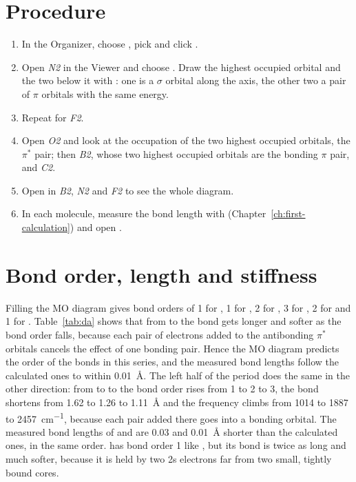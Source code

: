 \section{Procedure}
\begin{enumerate}
	\item In the Organizer, choose , pick  and click .
	\item Open \emph{N2} in the Viewer and choose . Draw the highest occupied orbital and the two below it with : one is a $\sigma$ orbital along the axis, the other two a pair of $\pi$ orbitals with the same energy.
	\item Repeat for \emph{F2}.
	\item Open \emph{O2} and look at the occupation of the two highest occupied orbitals, the $\pi^*$ pair; then \emph{B2}, whose two highest occupied orbitals are the bonding $\pi$ pair, and \emph{C2}.
	\item Open  in \emph{B2}, \emph{N2} and \emph{F2} to see the whole diagram.
	\item In each molecule, measure the bond length with  (Chapter~\ref{ch:first-calculation}) and open .
\end{enumerate}

\section{Bond order, length and stiffness}
Filling the MO diagram gives bond orders of 1 for , 1 for , 2 for , 3 for , 2 for  and 1 for . Table~\ref{tab:da} shows that from  to  the bond gets longer and softer as the bond order falls, because each pair of electrons added to the antibonding $\pi^*$ orbitals cancels the effect of one bonding pair. Hence the MO diagram predicts the order of the bonds in this series, and the measured bond lengths follow the calculated ones to within \SI{0.01}{\angstrom}. The left half of the period does the same in the other direction: from  to  to  the bond order rises from 1 to 2 to 3, the bond shortens from 1.62 to 1.26 to \SI{1.11}{\angstrom} and the frequency climbs from 1014 to 1887 to \SI{2457}{cm^{-1}}, because each pair added there goes into a bonding orbital. The measured bond lengths of  and  \cite{nistwebbook} are 0.03 and \SI{0.01}{\angstrom} shorter than the calculated ones, in the same order.  has bond order 1 like , but its bond is twice as long and much softer, because it is held by two 2s electrons far from two small, tightly bound cores.

